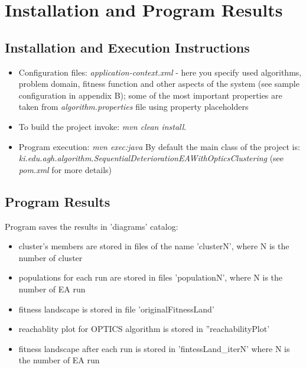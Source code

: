 \chapter{Installation and Program Results}
\label{ch:instResult}

\section{Installation and Execution Instructions}
\label{sec:installation}

\begin{itemize}
  \item Configuration files: \textit{application-context.xml} - here you
  specify used algorithms, problem domain, fitness function and other aspects
  of the system (see sample configuration in appendix B); some of the most
  important properties are taken from \textit{algorithm.properties} file
  using property placeholders 
  \item To build the project invoke: \textit{mvn clean install}. 
  \item Program execution: \textit{mvn exec:java} By default the main class of
  the project is:
  \textit{ki.edu.agh.algorithm.SequentialDeteriorationEAWithOpticsClustering}
  (see \textit{pom.xml} for more details)
\end{itemize}

\section{Program Results}
\label{sec:results}

Program saves the results in 'diagrams' catalog:
\begin{itemize}
 \item cluster's members are stored in files of the name 'clusterN', where N is
 the number of cluster 
 \item populations for each run are stored in files
 'populationN', where N is the number of EA run 
 \item fitness landscape is stored in file 'originalFitnessLand'
 \item reachablity plot for OPTICS algorithm is stored in ''reachabilityPlot'
 \item fitness landscape after each run is stored in 'fintessLand\_iterN' where
 N is the number of EA run
\end{itemize}
